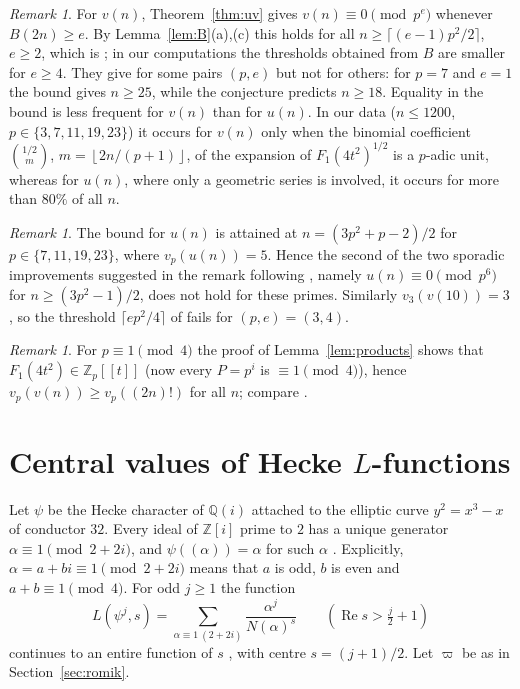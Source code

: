 \documentclass[11pt]{amsart}
\theoremstyle{definition}
\theoremstyle{remark}
\newtheorem{remark}[theorem]{Remark}
\newcommand{\Z}{\mathbb{Z}}
\newcommand{\Q}{\mathbb{Q}}
\newcommand{\fl}[1]{\left\lfloor #1 \right\rfloor}
\begin{document}
\begin{remark}\label{rem:v}
For $v(n)$, Theorem~\ref{thm:uv} gives $v(n)\equiv0\pmod{p^e}$ whenever $B(2n)\ge e$. By
Lemma~\ref{lem:B}(a),(c) this holds for all $n\ge\lceil(e-1)p^2/2\rceil$, $e\ge2$, which is
\cite[Theorem~17]{KM}; in our computations the thresholds obtained from $B$ are smaller for
$e\ge4$. They give \cite[Conjecture~44]{KM} for some pairs $(p,e)$ but not for others: for $p=7$
and $e=1$ the bound gives $n\ge25$, while the conjecture predicts $n\ge18$. Equality in the bound
is less frequent for $v(n)$ than for $u(n)$. In our data ($n\le1200$, $p\in\{3,7,11,19,23\}$) it
occurs for $v(n)$ only when the binomial coefficient $\binom{1/2}{m}$, $m=\fl{2n/(p+1)}$, of the
expansion of $F_1(4t^2)^{1/2}$ is a $p$-adic unit, whereas for $u(n)$, where only a geometric series
is involved, it occurs for more than $80\%$ of all $n$.
\end{remark}

\begin{remark}\label{rem:sporadic}
The bound for $u(n)$ is attained at $n=(3p^2+p-2)/2$ for $p\in\{7,11,19,23\}$, where
$v_p(u(n))=5$. Hence the second of the two sporadic improvements suggested in the remark following
\cite[Conjecture~43]{KM}, namely $u(n)\equiv0\pmod{p^6}$ for $n\ge(3p^2-1)/2$, does not hold for
these primes. Similarly $v_3(v(10))=3$, so the threshold $\lceil ep^2/4\rceil$ of
\cite[Conjecture~44(2)]{KM} fails for $(p,e)=(3,4)$.
\end{remark}

\begin{remark}\label{rem:split}
For $p\equiv1\pmod4$ the proof of Lemma~\ref{lem:products} shows that $F_1(4t^2)\in\Z_p[[t]]$
(now every $P=p^i$ is $\equiv1\pmod4$), hence $v_p(v(n))\ge v_p((2n)!)$ for all $n$; compare
\cite[Theorem~19]{KM}.
\end{remark}

\section{Central values of Hecke $L$-functions}\label{sec:Lvalues}

Let $\psi$ be the Hecke character of $\Q(i)$ attached to the elliptic curve $y^2=x^3-x$ of
conductor $32$. Every ideal of $\Z[i]$ prime to $2$ has a unique generator
$\alpha\equiv1\pmod{2+2i}$, and $\psi((\alpha))=\alpha$ for such $\alpha$
\cite[Chapter~18, \S\S4 and~6]{IR}. Explicitly, $\alpha=a+bi\equiv1\pmod{2+2i}$ means that $a$
is odd, $b$ is even and $a+b\equiv1\pmod4$. For odd $j\ge1$ the function
\[
L(\psi^j,s)=\sum_{\alpha\equiv1\ (2+2i)}\frac{\alpha^j}{N(\alpha)^s}\qquad(\operatorname{Re}s>\tfrac j2+1)
\]
continues to an entire function of $s$ \cite{Hecke18}, with centre $s=(j+1)/2$. Let $\varpi$ be as in
Section~\ref{sec:romik}.
\end{document}
